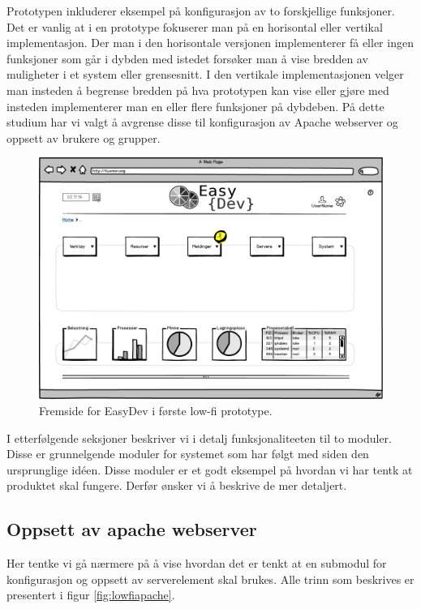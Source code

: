 Prototypen inkluderer eksempel på konfigurasjon av to forskjellige funksjoner.
Det er vanlig at i en prototype fokuserer man på en horisontal eller vertikal implementasjon. Der man i den horisontale versjonen implementerer få eller ingen funksjoner som går i dybden med istedet forsøker man å vise bredden av muligheter i et system eller grensesnitt. I den vertikale implementasjonen velger man insteden å begrense bredden på hva prototypen kan vise eller gjøre med insteden implementerer man en eller flere funksjoner på dybdeben.\cite{book:utforming}
På dette studium har vi valgt å avgrense disse til konfigurasjon av Apache webserver og oppsett av brukere og grupper. 

\begin{figure}
\includegraphics[width=\textwidth,height=\textheight,keepaspectratio]{./img/prosessdokumentasjon/lowfi/fremside.png}
\caption[Low-fi prototype]{Fremside for EasyDev i første low-fi prototype.}
\label{fig:lowfi_fremside}
\end{figure}


I etterfølgende seksjoner beskriver vi i detalj funksjonaliteeten til to moduler. Disse er grunnelgende moduler for systemet som har følgt med siden den ursprunglige idéen. Disse moduler er et godt eksempel på hvordan vi har tentk at produktet skal fungere. Derfør ønsker vi å beskrive de mer detaljert.

\subsection{Oppsett av apache webserver}
Her tentke vi gå nærmere på å vise hvordan det er tenkt at en submodul for konfigurasjon og oppsett av serverelement skal brukes. Alle trinn som beskrives er presentert i figur \ref{fig:lowfiapache}.

